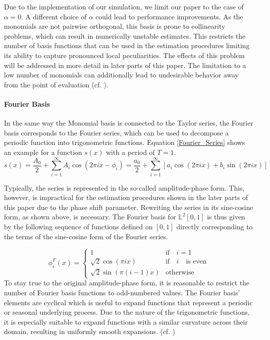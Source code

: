 \documentclass[11pt,twoside,a4paper]{article}
\begin{document}
	Due to the implementation of our simulation, we limit our paper to the case of $\alpha = 0$. A different choice of $\alpha$ could lead to performance improvements.
	As the monomials are not pairwise orthogonal, this basis is prone to collinearity problems, which can result in numerically unstable estimates. This restricts the number of basis functions that can be used in the estimation procedures limiting its ability to capture pronounced local peculiarities. The effects of this problem will be addressed in more detail in later parts of this paper. The limitation to a low number of monomials can additionally lead to undesirable behavior away from the point of evaluation (cf. \cite{ramsay_functional_2005}).
	\vspace{-0.2cm}
	
	\paragraph{Fourier Basis}
	In the same way the Monomial basis is connected to the Taylor series, the Fourier basis corresponds to the Fourier series, which can be used to decompose a periodic function into trigonometric functions. Equation \ref{Fourier_Series} shows an example for a function $s(x)$ with a period of $T = 1$.
	\begin{equation}\label{Fourier_Series}
		s(x) = \frac{A_0}{2} + \sum_{i = 1}^{\infty} A_i \cos(2\pi i x - \phi_i) = \frac{a_0}{2} + \sum_{i = 1}^{\infty}\left[a_i \cos(2\pi i x) + b_i \sin(2\pi i x)\right]
	\end{equation}
	
	Typically, the series is represented in the so-called amplitude-phase form. This, however, is impractical for the estimation procedures shown in the later parts of this paper due to the phase shift parameter. Rewriting the series in its sine-cosine form, as shown above, is necessary.
	The Fourier basis for $\mathbb{L}^2[0,1]$ is thus given by the following sequence of functions defined on $[0,1]$ directly corresponding to the terms of the sine-cosine form of the Fourier series.
	
	\begin{equation}
		\phi_{i}^{F}(x) = 
		\begin{cases}
			1 & \text{if} \quad i = 1\\
			\sqrt{2} \cos(\pi i x) & \text{if} \quad i \quad \text{is even} \\
			\sqrt{2} \sin(\pi (i-1)x) & \text{otherwise}
		\end{cases}
	\end{equation}
	To stay true to the original amplitude-phase form, it is reasonable to restrict the number of Fourier basis functions to odd-numbered values. The Fourier basis' elements are cyclical which is useful to expand functions that represent a periodic or seasonal underlying process. Due to the nature of the trigonometric functions, it is especially suitable to expand functions with a similar curvature across their domain, resulting in uniformly smooth expansions. (cf. \cite{ramsay_functional_2005})
	\vspace{-0.2cm}
\end{document}
